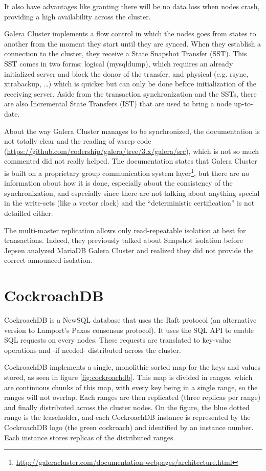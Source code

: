 It also have advantages like granting there will be no data loss when nodes crash, providing a high availability across the cluster.

Galera Cluster implements a flow control in which the nodes goes from states to another from the moment they start until they are synced. When they establish a connection to the cluster, they receive a State Snapshot Transfer (SST). This SST comes in two forms: logical (mysqldump), which requires an already initialized server and block the donor of the transfer, and physical (e.g. rsync, xtrabackup, \dots) which is quicker but can only be done before initialization of the receiving server. Aside from the transaction synchronization and the SSTs, there are also Incremental State Transfers (IST) that are used to bring a node up-to-date.

About the way Galera Cluster manages to be synchronized, the documentation is not totally clear and the reading of wsrep code (\url{https://github.com/codership/galera/tree/3.x/galera/src}), which is not so much commented did not really helped. The documentation states that Galera Cluster is built on a proprietary group communication system layer\footnote{\url{http://galeracluster.com/documentation-webpages/architecture.html}}, but there are no information about how it is done, especially about the consistency of the synchronization, and especially since there are not talking about anything special in the write-sets (like a vector clock) and the ``deterministic certification'' is not detailled either.

The multi-master replication allows only read-repeatable isolation at best for transactions. Indeed, they previously talked about Snapshot isolation before Jepsen analyzed MariaDB Galera Cluster and realized they did not provide the correct announced isolation\cite{MGC:jepsen}.



\section{CockroachDB}
\label{sec:cockroachdb}
CockroachDB is a NewSQL database that uses the Raft protocol (an alternative version to Lamport's Paxos consensus protocol).
It uses the SQL API to enable SQL requests on every nodes. These requests are translated to key-value operations and -if needed- distributed across the cluster.

CockroachDB implements a single, monolithic sorted map for the keys and values stored, as seen in figure \ref{fig:cockroachdb}. This map is divided in ranges, which are continuous chunks of this map, with every key being in a single range, so the ranges will not overlap. Each ranges are then replicated (three replicas per range) and finally distributed across the cluster nodes.\cite{CRDB:automatedoperations} On the figure, the blue dotted range is the leaseholder, and each CockroachDB instance is represented by the CockroachDB logo (the green cockroach) and identified by an instance number. Each instance stores replicas of the distributed ranges.

